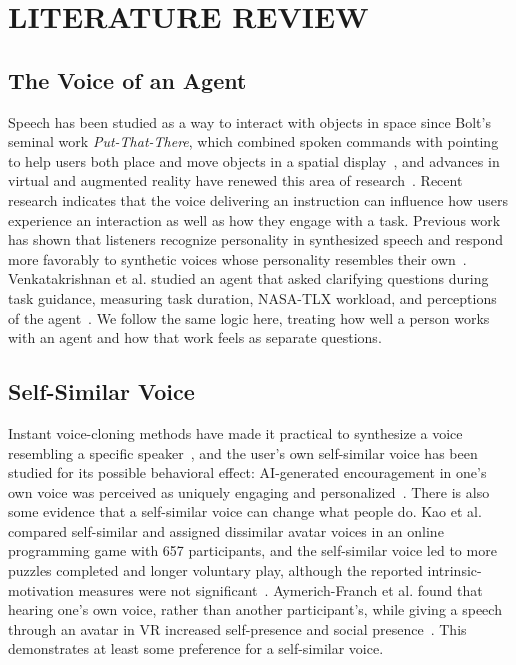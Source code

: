 \chapter{LITERATURE REVIEW}
\label{ch:literature}
\section{The Voice of an Agent}
Speech has been studied as a way to interact with objects in space since Bolt's seminal work \emph{Put-That-There}, which combined spoken commands with pointing to help users both place and move objects in a spatial display~\cite{bolt1980putthatthere}, and advances in virtual and augmented reality have renewed this area of research~\cite{zhang2023seehear,kim2026speechtospatial,tanaka2026coarse}. Recent research indicates that the voice delivering an instruction can influence how users experience an interaction as well as how they engage with a task. Previous work has shown that listeners recognize personality in synthesized speech and respond more favorably to synthetic voices whose personality resembles their own~\cite{nass2001personality}. Venkatakrishnan et al. studied an agent that asked clarifying questions during task guidance, measuring task duration, NASA-TLX workload, and perceptions of the agent~\cite{venkatakrishnan2026clarifying}. We follow the same logic here, treating how well a person works with an agent and how that work feels as separate questions.

\section{Self-Similar Voice}
Instant voice-cloning methods have made it practical to synthesize a voice resembling a specific speaker~\cite{qin2023openvoice}, and the user's own self-similar voice has been studied for its possible behavioral effect: AI-generated encouragement in one's own voice was perceived as uniquely engaging and personalized~\cite{fang2025emotional}. There is also some evidence that a self-similar voice can change what people do. Kao et al. compared self-similar and assigned dissimilar avatar voices in an online programming game with 657 participants, and the self-similar voice led to more puzzles completed and longer voluntary play, although the reported intrinsic-motivation measures were not significant~\cite{kao2021selfsimilar}. Aymerich-Franch et al. found that hearing one's own voice, rather than another participant's, while giving a speech through an avatar in VR increased self-presence and social presence~\cite{aymerich2012voicesimilarity}. This demonstrates at least some preference for a self-similar voice.

